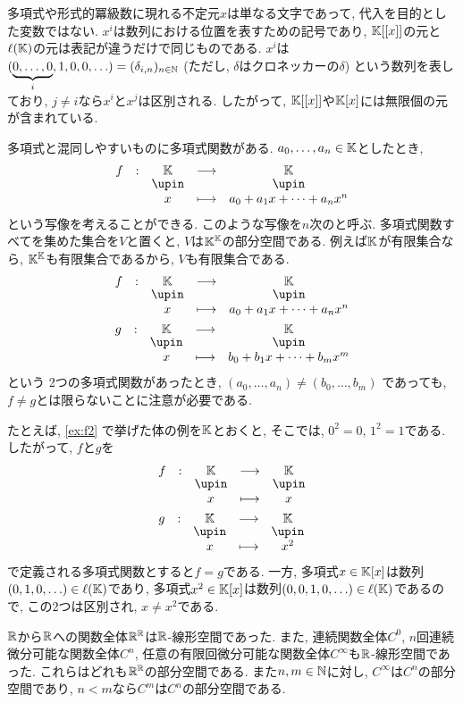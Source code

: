 \begin{remark}
  多項式や形式的冪級数に現れる不定元$x$は単なる文字であって,
  代入を目的とした変数ではない.
  $x^i$は数列における位置を表すための記号であり,
  $\mathbb{K}[[x]]$の元と$\ell(\mathbb{K})$の元は表記が違うだけで同じものである.
  $x^i$は$(\underbrace{0,\ldots,0}_{i},1,0,0,\ldots)=(\delta_{i,n})_{n\in\mathbb{N}}$ (ただし, $\delta$はクロネッカーの$\delta$)
  という数列を表しており,
  $j\neq i$なら$x^i$と$x^j$は区別される.
  したがって,
  $\mathbb{K}[[x]]$や$\mathbb{K}[x]$には無限個の元が含まれている.

  多項式と混同しやすいものに多項式関数がある.
  $a_0,\ldots, a_n\in \mathbb{K}$としたとき,
  \begin{align*}
  \shazo{f}{\KK}{\KK}
  {x}{a_0+a_1x+\cdots+a_nx^n}
  \end{align*}
  という写像を考えることができる.
  このような写像を$n$次のと呼ぶ.
  多項式関数すべてを集めた集合を$V$と置くと,
  $V$は$\mathbb{K}^{\mathbb{K}}$の部分空間である.
  例えば$\mathbb{K}$が有限集合なら,
  $\mathbb{K}^{\mathbb{K}}$も有限集合であるから,
  $V$も有限集合である.
  \begin{align*}
  &\shazo{f}{\KK}{\KK}
  {x}{a_0+a_1x+\cdots+a_nx^n}
  \\
  &\shazo{g}{\KK}{\KK}
  {x}{b_0+b_1x+\cdots+b_mx^m}
  \end{align*}
  という
  2つの多項式関数があったとき,
  $(a_0,\ldots,a_n)\neq (b_0,\ldots,b_m)$
  であっても, $f\neq g$とは限らないことに注意が必要である.

  たとえば,
  \cref{ex:f2}
  で挙げた体の例を$\mathbb{K}$とおくと,
  そこでは, $0^2=0$, $1^2=1$である.
  したがって, $f$と$g$を
  \begin{align*}
  &\shazo{f}{\KK}{\KK}
  {x}{x}
  \\
  &\shazo{g}{\KK}{\KK}
  {x}{x^2}
  \end{align*}
  で定義される多項式関数とすると$f=g$である.
  一方, 多項式$x\in\mathbb{K}[x]$は数列$(0,1,0,\ldots)\in\ell(\mathbb{K})$であり,
  多項式$x^2\in\mathbb{K}[x]$は数列$(0,0,1,0,\ldots)\in\ell(\mathbb{K})$であるので,
  この2つは区別され, $x\neq x^2$である.
\end{remark}

\begin{example}
$\mathbb{R}$から$\mathbb{R}$への関数全体$\mathbb{R}^{\mathbb{R}}$は$\mathbb{R}$-線形空間であった.
また, 連続関数全体$C^0$, $n$回連続微分可能な関数全体$C^n$,
任意の有限回微分可能な関数全体$C^\infty$も$\mathbb{R}$-線形空間であった.
これらはどれも$\mathbb{R}^{\mathbb{R}}$の部分空間である.
また$n,m\in \mathbb{N}$に対し, $C^\infty$は$C^n$の部分空間であり,
$n<m$なら$C^m$は$C^n$の部分空間である.
\end{example}

